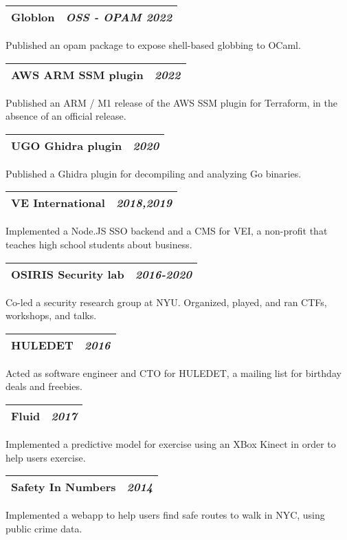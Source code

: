\documentclass[letterpaper,10pt]{article}
\makeatletter
\newcommand{\sectiontitle}[2]{%
  \begin{tabularx}{\linewidth}{@{} X c @{}}
    {\sffamily\textbf{#1}} & {\rmfamily\textit{#2}} \\ \hline
  \end{tabularx}%
  \vspace{3pt}%
}
\makeatother
\begin{document}
\begin{minipage}[t]{\secondcolwidth}
  \sectiontitle{Globlon}{OSS - OPAM 2022}
  Published an opam package to expose shell-based globbing to OCaml.

  \vspace{6pt}
  \sectiontitle{AWS ARM SSM plugin}{2022}
  Published an ARM / M1 release of the AWS SSM plugin for Terraform, in the absence of an official release.

  \vspace{6pt}
  \sectiontitle{UGO Ghidra plugin}{2020}
  Published a Ghidra plugin for decompiling and analyzing Go binaries.

  \vspace{6pt}
  \sectiontitle{VE International}{2018,2019}
  Implemented a Node.JS SSO backend and a CMS for VEI, a non-profit that teaches high school students about business.

  \vspace{6pt}
  \sectiontitle{OSIRIS Security lab}{2016-2020}
  Co-led a security research group at NYU. Organized, played, and ran CTFs, workshops, and talks.

  \vspace{6pt}
  \sectiontitle{HULEDET}{2016}
  Acted as software engineer and CTO for HULEDET, a mailing list for birthday deals and freebies.

  \vspace{1cm plus 1fill}
  \vspace{6pt}
  \sectiontitle{Fluid}{2017}
  Implemented a predictive model for exercise using an XBox Kinect in order to help users exercise.

  \sectiontitle{Safety In Numbers}{2014}
  Implemented a webapp to help users find safe routes to walk in NYC, using public crime data.
\end{minipage}

\vfill

\setlength{\arrayrulewidth}{0.1pt}
\end{document}

